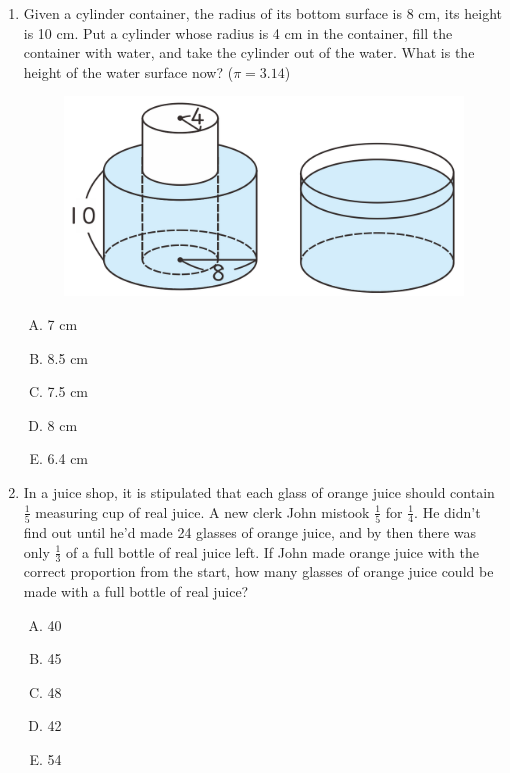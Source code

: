 \documentclass[12pt]{scrartcl}
\begin{document}
\begin{enumerate}
    \item Given a cylinder container, the radius of its bottom surface is 8 cm, its height is 10 cm. Put a cylinder whose radius is 4 cm in the container, fill the container with water, and take the cylinder out of the water. What is the height of the water surface now? ($\pi = 3.14$)
    \begin{figure}[h]
        \centering
        \includegraphics[scale=0.4]{StarGen/0Figure/wmi2023G6A-num7.png}
    \end{figure}
    \begin{multicols}{5}
        \begin{enumerate}[(A)]
            \item 7 cm
            \item 8.5 cm
            \item 7.5 cm
            \item 8 cm
            \item 6.4 cm
        \end{enumerate}
    \end{multicols} \hrulefill

    \item In a juice shop, it is stipulated that each glass of orange juice should contain $\frac{1}{5}$ measuring cup of real juice. A new clerk John mistook $\frac{1}{5}$ for $\frac{1}{4}$. He didn't find out until he'd made 24 glasses of orange juice, and by then there was only $\frac{1}{3}$ of a full bottle of real juice left. If John made orange juice with the correct proportion from the start, how many glasses of orange juice could be made with a full bottle of real juice?
    \begin{multicols}{5}
        \begin{enumerate}[(A)]
            \item 40
            \item 45
            \item 48
            \item 42
            \item 54
        \end{enumerate}
    \end{multicols} \hrulefill


\end{enumerate}
\end{document}
